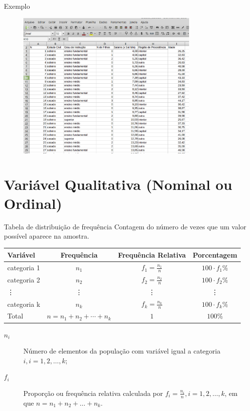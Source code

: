 \documentclass[9pt]{beamer}
\begin{document}
\begin{frame}{Exemplo}
\begin{figure}
	\centering
	\includegraphics[width = 9cm]{tabela21.png}
\end{figure}
\end{frame}

\section{Variável Qualitativa (Nominal ou Ordinal)}

\begin{frame}{}
	\begin{block}{Tabela de distribuição de frequência}
		Contagem do número de vezes que um valor possível aparece na amostra.
	\end{block}
	
	\begin{table}
		\centering
		\begin{tabular}{l|ccc}
			\toprule[0.05cm]
			Variável & Frequência & Frequência Relativa & Porcentagem \\ \midrule[0.05cm]
			categoria 1 & $n_1$ & $f_1=\frac{n_1}{n}$ & $100 \cdot f_1 \%$\\
			categoria 2 & $n_2$ & $f_2=\frac{n_2}{n}$ & $100 \cdot f_2\%$\\
			\vdots & \vdots & \vdots & \vdots \\
			categoria k & $n_k$ & $f_k = \frac{n_k}{n}$ & $100 \cdot f_k\%$\\ \midrule[0.05cm]
			Total & $n=n_1 + n_2 + \cdots + n_k$ & $1$ & $100\%$ \\
			\bottomrule[0.05cm]
		\end{tabular}
	\end{table}
	
	\begin{description}
		\item[$n_i$] Número de elementos da população com variável igual a categoria $i, i=1,2, \dots, k$;
		\item[$f_i$] Proporção ou frequência relativa calculada por $f_i = \frac{n_i}{n}, i=1,2,\dots,k$, em que $n=n_1+n_2+\dots+n_k$.
	\end{description}

\end{frame}
\end{document}
